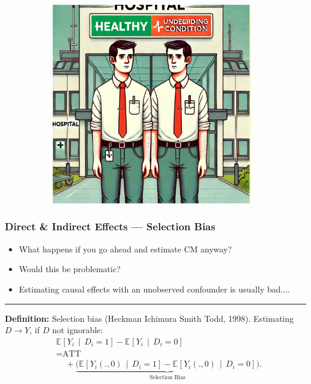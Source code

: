 \documentclass[dvipsnames]{beamer} %
\newcommand{\Egiven}[3][]{\mathbb{E}_{#1} \left[ #2 \, \middle\vert \, #3 \right]} %
\begin{document}
\begin{frame}[noframenumbering]
\begin{figure}[h!]
\begin{subfigure}[c]{0.475\textwidth}
            \includegraphics[width=0.965\textwidth]{presentation-files/headlines/health-differences.jpg}
        \end{subfigure}
    \end{figure}
\end{frame}
\begin{frame}
    \frametitle{Direct \& Indirect Effects --- Selection Bias}
    \begin{itemize}
        \item What happens if you go ahead and estimate CM anyway?
        \item Would this be problematic?
        \item Estimating causal effects with an unobserved confounder is usually bad$\hdots$.
    \end{itemize}
    \par\noindent\rule{\textwidth}{0.4pt}
    \vskip0.25cm
    \textbf{Definition:} Selection bias (Heckman Ichimura Smith Todd, 1998).
    \vskip0.25cm
    Estimating $D \to Y$, if $D$ not ignorable:
    \begin{align*}
        &\Egiven{ Y_i}{D_i =1} - \Egiven{ Y_i}{D_i =0} \\
        &= \text{ATT} \\
        &\;\;\;\; + \underbrace{\Big(
            \Egiven{ Y_i(.,0)}{D_i =1} - \Egiven{ Y_i(.,0)}{D_i =0} \Big)}_{
                \text{Selection Bias}}.
    \end{align*}
    \vskip1.125cm
\end{frame}
\end{document}
